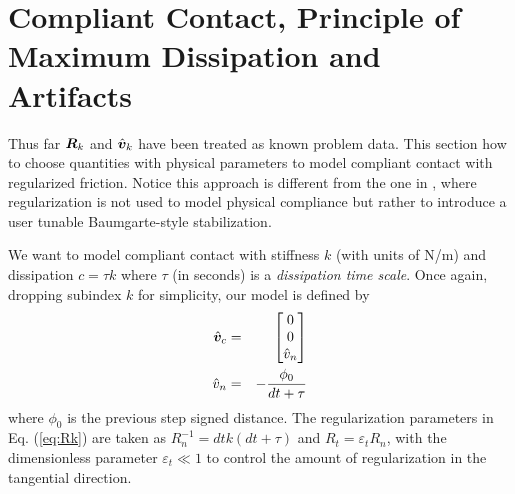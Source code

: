 \section{Compliant Contact, Principle of Maximum Dissipation and Artifacts}
\label{sec:physical_intuition}

Thus far ${\bm{R}}_k$ and $\hat{{\bm{v}}}_k$ have been treated as known problem
data. This section how to choose  quantities with
physical parameters to model compliant contact with regularized friction.  Notice
this approach is different from the one in \cite{bib:todorov2014}, where
regularization is not used to model physical compliance but rather to introduce
a user tunable Baumgarte-style stabilization.

We want to model compliant contact with stiffness $k$ (with units of N/m) and
dissipation $c = \tau k$ where $\tau$ (in seconds) is a \textit{dissipation time
scale}. Once again, dropping subindex $k$ for simplicity, our model is defined
by
\begin{eqnarray}
	\hat{{\bm{v}}}_c &=&
	\begin{bmatrix}
		0\\
		0\\
		\hat{v}_n \end{bmatrix}\nonumber\\
	\hat{v}_n &=& -\frac{\phi_0}{dt+\tau}
\end{eqnarray}
where $\phi_0$ is the previous step signed distance. The regularization
parameters in Eq. (\ref{eq:Rk}) are taken as $R_n^{-1} = dt k(dt+\tau)$ and
$R_t=\varepsilon_t R_n$, with the dimensionless parameter $\varepsilon_t \ll 1$
to control the amount of regularization in the tangential direction.

